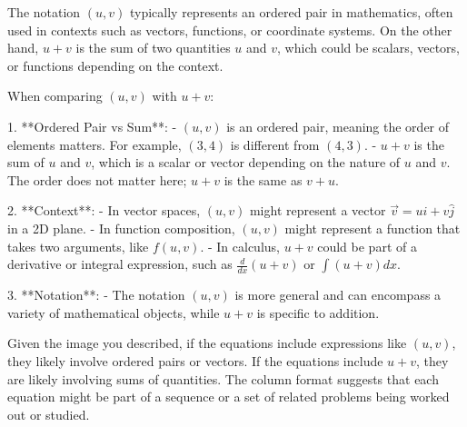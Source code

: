 The notation \((u, v)\) typically represents an ordered pair in mathematics, often used in contexts such as vectors, functions, or coordinate systems. On the other hand, \(u + v\) is the sum of two quantities \(u\) and \(v\), which could be scalars, vectors, or functions depending on the context.

When comparing \((u, v)\) with \(u + v\):

1. **Ordered Pair vs Sum**: 
   - \((u, v)\) is an ordered pair, meaning the order of elements matters. For example, \((3, 4)\) is different from \((4, 3)\).
   - \(u + v\) is the sum of \(u\) and \(v\), which is a scalar or vector depending on the nature of \(u\) and \(v\). The order does not matter here; \(u + v\) is the same as \(v + u\).

2. **Context**:
   - In vector spaces, \((u, v)\) might represent a vector \(\vec{v} = u\hat{i} + v\hat{j}\) in a 2D plane.
   - In function composition, \((u, v)\) might represent a function that takes two arguments, like \(f(u, v)\).
   - In calculus, \(u + v\) could be part of a derivative or integral expression, such as \(\frac{d}{dx}(u + v)\) or \(\int (u + v) dx\).

3. **Notation**:
   - The notation \((u, v)\) is more general and can encompass a variety of mathematical objects, while \(u + v\) is specific to addition.

Given the image you described, if the equations include expressions like \((u, v)\), they likely involve ordered pairs or vectors. If the equations include \(u + v\), they are likely involving sums of quantities. The column format suggests that each equation might be part of a sequence or a set of related problems being worked out or studied.